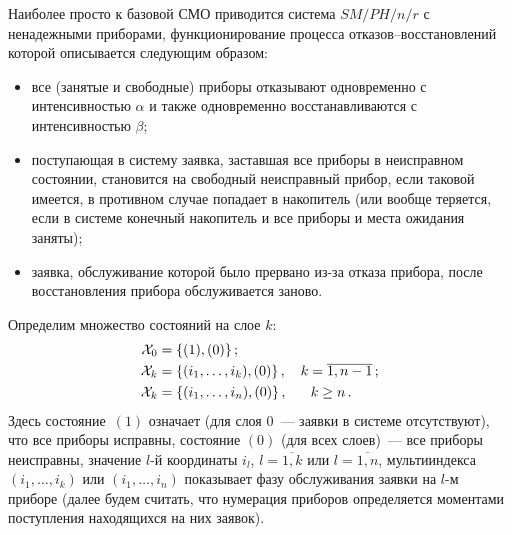 \begin{multicols}{2}
Наиболее просто к базовой СМО приводится система $SM/PH/n/r$
с ненадежными приборами, функционирование процесса
отказов--вос\-ста\-нов\-лений которой описывается следующим
образом:
\begin{itemize}
\item все (занятые и свободные) приборы отказывают одновременно
с интенсивностью $\alpha$ и также одновременно
восстанавливаются с интенсивностью $\beta$;
    \item поступающая в систему заявка, заставшая все приборы в неисправном
состоянии, становится на свободный неисправный прибор, если
таковой имеется, в противном случае попадает в накопитель
(или вообще теряется, если в системе конечный накопитель
и все приборы и места ожидания заняты);
\item заявка, обслуживание которой было прервано из-за отказа прибора,
после восстановления прибора обслуживается заново.
\end{itemize}

Определим множество состояний на слое $k$:
\begin{align*}
{\cal X}_0 &= \{(1), (0)\}\,;\\
{\cal X}_k &= \{(i_1,\ldots,i_k), (0)\}\,,\quad k=\overline{1,n-1}\,;\\
{\cal X}_k &= \{(i_1,\ldots,i_n), (0)\}\,,\quad \ \ k \ge n\,.
\end{align*}
Здесь состояние~$(1)$ означает (для слоя 0~--- заявки в системе
отсутствуют), что все приборы исправны, состояние $(0)$
(для всех слоев)~--- все приборы неисправны, значение $l$-й
координаты $i_l$, $l=\overline{1,k}$ или $l=\overline{1,n}$,
мультииндекса $(i_1,\ldots,i_k)$ или $(i_1,\ldots,i_n)$ показывает
фазу обслуживания заявки на $l$-м приборе (далее будем считать,
что нумерация приборов определяется моментами поступления находящихся
на них заявок).


\end{multicols}
